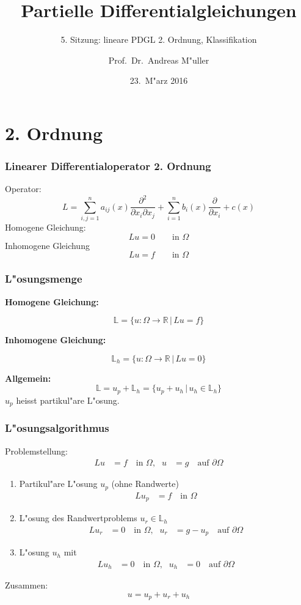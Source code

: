 \documentclass{beamer}
\title[]{Partielle Differentialgleichungen}
\subtitle{5. Sitzung: lineare PDGL 2. Ordnung, Klassifikation}
\date[23.~M"arz 2016]{23.~M"arz 2016}
\author{Prof.~Dr.~Andreas M"uller}
\begin{document}
\begin{frame}
\titlepage
\end{frame}

\section{2. Ordnung}

\begin{frame}
\frametitle{Linearer Differentialoperator 2. Ordnung}
Operator:
\[
L
=
\sum_{i,j=1}^n a_{ij}(x)\frac{\partial^2}{\partial x_i\partial x_j}
+
\sum_{i=1}^n b_i(x)\frac{\partial}{\partial x_i}
+
c(x)
\]
Homogene Gleichung:
\[
Lu=0\qquad\text{in $\Omega$}
\]
Inhomogene Gleichung
\[
Lu=f\qquad\text{in $\Omega$}
\]
\end{frame}

\begin{frame}
\frametitle{L"osungsmenge}
{\bf Homogene Gleichung:}

\[
{\mathbb L}
=\{
u\colon \Omega\to \mathbb R\,|\, Lu=f
\}
\]

\bigskip

{\bf Inhomogene Gleichung:}

\[
{\mathbb L}_h
=\{
u\colon \Omega\to \mathbb R\,|\, Lu=0
\}
\]

{\bf Allgemein:}
\[
{\mathbb L} = u_p + {\mathbb L}_h
=\{u_p+u_h\,|\,u_h\in\mathbb L_h\}
\]
$u_p$ heisst partikul"are L"osung.

\end{frame}

\begin{frame}
\frametitle{L"osungsalgorithmus}
Problemstellung:
\begin{align*}
Lu&=f\quad\text{in $\Omega$,}
&
 u&=g\quad\text{auf $\partial\Omega$}
\end{align*}

\begin{enumerate}
\item Partikul"are L"osung $u_p$ (ohne Randwerte)
\begin{align*}
Lu_p&=f\quad\text{in $\Omega$}
\end{align*}
\item
L"osung des Randwertproblems $u_r\in\mathbb L_h$
\begin{align*}
Lu_r&=0    \quad\text{in $\Omega$,}&
 u_r&=g-u_p\quad\text{auf $\partial\Omega$}
\end{align*}
\item
L"osung $u_h$ mit
\begin{align*}
Lu_h&=0\quad\text{in $\Omega$,}
&
 u_h&=0\quad\text{auf $\partial\Omega$}
\end{align*}
\end{enumerate}
Zusammen:
\[
u = u_p+u_r+u_h
\]
\end{frame}
\end{document}
